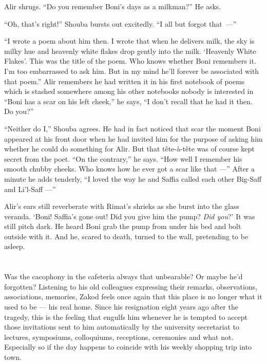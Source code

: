 \documentclass[twoside,11pt,openany]{book}
\begin{document}
Alir shrugs. ``Do you remember Boni's days as a milkman?'' He asks.

``Oh, that's right!'' Shouba bursts out excitedly. ``I all but forgot that~---''

``I wrote a poem about him then. I wrote that when he delivers milk, the sky is milky hue and heavenly
white flakes drop gently into the milk. `Heavenly White Flakes'. This was the title of the poem. Who knows whether Boni
remembers it. I'm too embarrassed to ask him. But in my mind he'll forever be associated with that poem.''
Alir remembers he had written it in his first notebook of poems which is stashed somewhere among his other notebooks
nobody is interested in ``Boni has a scar on his left cheek,'' he says, ``I
don't recall that he had it then. Do you?''

``Neither do I,'' Shouba agrees.  He had in fact noticed that scar the moment Boni appeared
at his front door when he had invited him for the purpose of asking him whether he could do something for Alir. But
that t\^ete-\`a-t\^ete was of course kept secret from the poet. ``On the contrary,'' he says.
``How well I remember his smooth chubby cheeks. Who knows how he ever got a scar like
that ---'' After a minute he adds tenderly, ``I loved the way he and Saffia called each other
Big-Saff and Li'l-Saff ---''

Alir's ears still reverberate with Rimat's shrieks as she burst into the glass veranda.  `Boni! Saffia's gone
out! Did you give him the pump? \textit{Did you}?' It was still pitch dark. He heard Boni grab the pump from under his
bed and bolt outside with it. And he, scared to death, turned to the wall, pretending to be asleep.



\chapter{}

Was the cacophony in the cafeteria always that unbearable? Or maybe he'd forgotten?  Listening to his old colleagues
expressing their remarks, observations, associations, memories, Zakod feels once again that this place is no longer
what it used to be --- his real home. Since his resignation eight years ago after the tragedy, this is the feeling that
engulfs him whenever he is tempted to accept those invitations sent to him automatically by the university secretariat
to lectures, symposiums, colloquiums, receptions, ceremonies and what not. Especially so if the day happens
to coincide with his weekly shopping trip into town.
\end{document}
